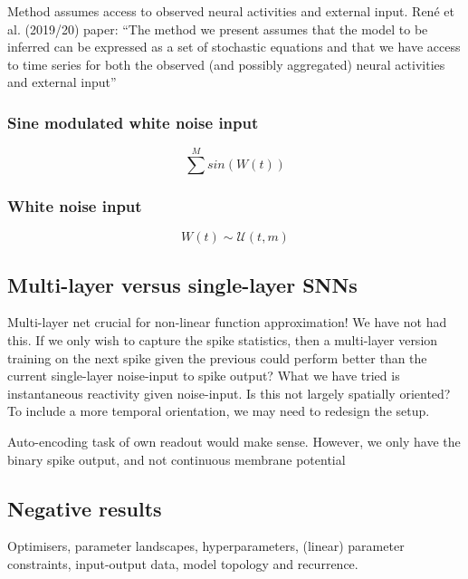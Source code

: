 \documentclass[mphil,deptreport,ai]{infthesis} %
\begin{document}
Method assumes access to observed neural activities and external input.
René et al. (2019/20) paper:
“The method we present assumes that the model to be inferred can be expressed as a
set of stochastic equations and that we have access to time series for both the observed (and possibly aggregated) neural activities and external input”


\subsubsection{Sine modulated white noise input}

\begin{equation}
    \sum^M sin(W(t))
\end{equation}

\subsubsection{White noise input}

\begin{equation}
    W(t) \sim \mathcal{U}(t, m)
\end{equation}

\subsection{Multi-layer versus single-layer SNNs}

Multi-layer net crucial for non-linear function approximation! We have not had this. If we only wish to capture the spike statistics, then a multi-layer version training on the next spike given the previous could perform better than the current single-layer noise-input to spike output?
What we have tried is instantaneous reactivity given noise-input. Is this not largely spatially oriented? To include a more temporal orientation, we may need to redesign the setup.

Auto-encoding task of own readout would make sense. However, we only have the binary spike output, and not continuous membrane potential


\subsection{Negative results}

Optimisers, parameter landscapes, hyperparameters, (linear) parameter constraints, input-output data, model topology and recurrence.
\end{document}

